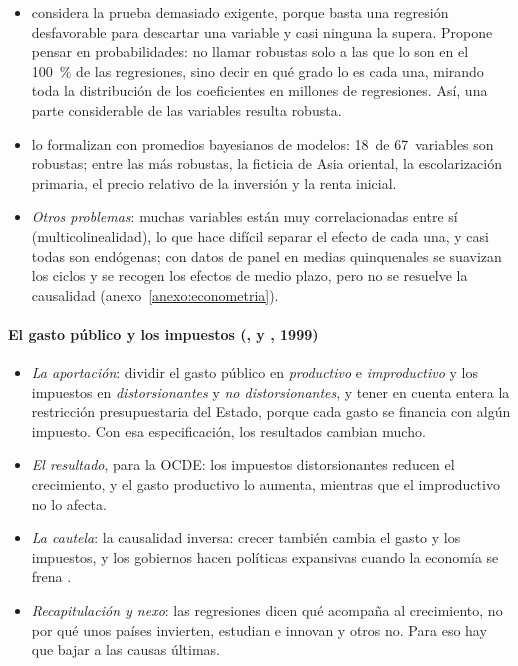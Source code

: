 \documentclass[11pt]{article}
\begin{document}
\begin{itemize}
\item \textcite{SalaiMartin1997} considera la prueba demasiado exigente, porque basta una regresión desfavorable para descartar una variable y casi ninguna la supera. Propone pensar en probabilidades: no llamar robustas solo a las que lo son en el 100~\% de las regresiones, sino decir en qué grado lo es cada una, mirando toda la distribución de los coeficientes en millones de regresiones. Así, una parte considerable de las variables resulta robusta.
\item \textcite{SalaiMartinDoppelhoferMiller2004} lo formalizan con promedios bayesianos de modelos: 18~de 67~variables son robustas; entre las más robustas, la ficticia de Asia oriental, la escolarización primaria, el precio relativo de la inversión y la renta inicial.
\item \emph{Otros problemas}: muchas variables están muy correlacionadas entre sí (multicolinealidad), lo que hace difícil separar el efecto de cada una, y casi todas son endógenas; con datos de panel en medias quinquenales se suavizan los ciclos y se recogen los efectos de medio plazo, pero no se resuelve la causalidad (anexo~\ref{anexo:econometria}).
\end{itemize}

\paragraph{El gasto público y los impuestos (,  y , 1999)}

\begin{itemize}
\item \emph{La aportación}: dividir el gasto público en \emph{productivo} e \emph{improductivo} y los impuestos en \emph{distorsionantes} y \emph{no distorsionantes}, y tener en cuenta entera la restricción presupuestaria del Estado, porque cada gasto se financia con algún impuesto. Con esa especificación, los resultados cambian mucho.
\item \emph{El resultado}, para la OCDE: los impuestos distorsionantes reducen el crecimiento, y el gasto productivo lo aumenta, mientras que el improductivo no lo afecta\nocite{KnellerBleaneyGemmell1999}.
\item \emph{La cautela}: la causalidad inversa: crecer también cambia el gasto y los impuestos, y los gobiernos hacen políticas expansivas cuando la economía se frena .
\item \emph{Recapitulación y nexo}: las regresiones dicen qué acompaña al crecimiento, no por qué unos países invierten, estudian e innovan y otros no. Para eso hay que bajar a las causas últimas.
\end{itemize}
\end{document}
